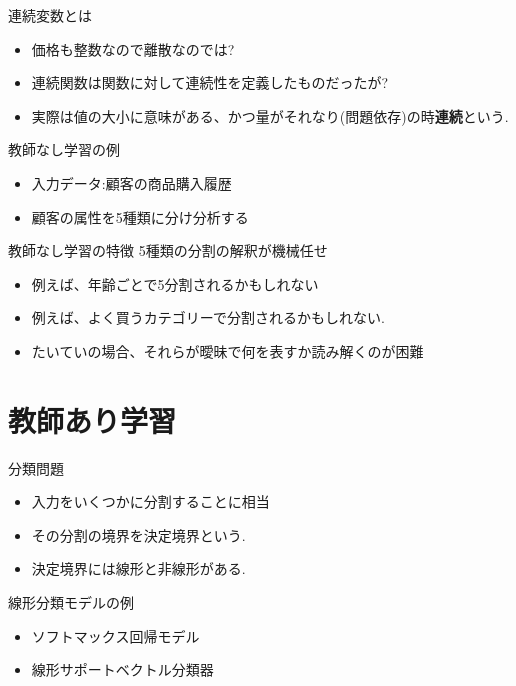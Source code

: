 \begin{frame}{連続変数とは}
\begin{itemize}
\item 価格も整数なので離散なのでは?
\item 連続関数は関数に対して連続性を定義したものだったが?
\item 実際は値の大小に意味がある、かつ量がそれなり(問題依存)の時\textbf{連続}という.
\end{itemize}
\end{frame}


\begin{frame}{教師なし学習の例}
\begin{itemize}
\item 入力データ:顧客の商品購入履歴
\item 顧客の属性を5種類に分け分析する
\end{itemize}
\end{frame}


\begin{frame}{教師なし学習の特徴}
5種類の分割の解釈が機械任せ
\begin{itemize}
  \item 例えば、年齢ごとで5分割されるかもしれない
  \item 例えば、よく買うカテゴリーで分割されるかもしれない.
  \item たいていの場合、それらが曖昧で何を表すか読み解くのが困難
\end{itemize}
\end{frame}


\section{教師あり学習}


\begin{frame}{分類問題}
\begin{itemize}
\item 入力をいくつかに分割することに相当
\item その分割の境界を決定境界という.
\item 決定境界には線形と非線形がある.
\end{itemize}
\end{frame}


\begin{frame}{線形分類モデルの例}
\begin{itemize}
\item ソフトマックス回帰モデル
\item 線形サポートベクトル分類器
\end{itemize}
\end{frame}


